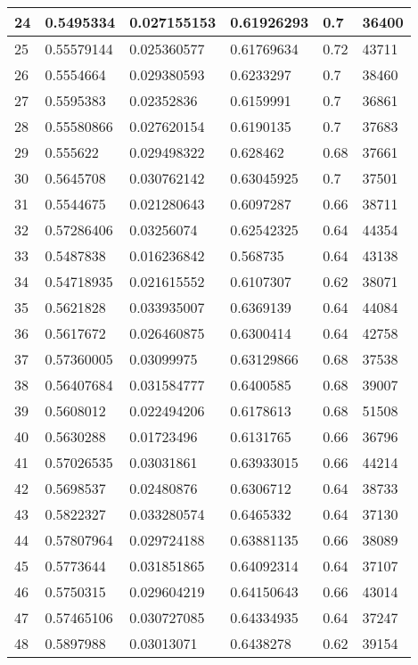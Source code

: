 \begin{longtable}{|l|l|l|l|l|l|}
24 & 0.5495334 & 0.027155153 & 0.61926293 & 0.7 & 36400 \\ \hline 
25 & 0.55579144 & 0.025360577 & 0.61769634 & 0.72 & 43711 \\ \hline 
26 & 0.5554664 & 0.029380593 & 0.6233297 & 0.7 & 38460 \\ \hline 
27 & 0.5595383 & 0.02352836 & 0.6159991 & 0.7 & 36861 \\ \hline 
28 & 0.55580866 & 0.027620154 & 0.6190135 & 0.7 & 37683 \\ \hline 
29 & 0.555622 & 0.029498322 & 0.628462 & 0.68 & 37661 \\ \hline 
30 & 0.5645708 & 0.030762142 & 0.63045925 & 0.7 & 37501 \\ \hline 
31 & 0.5544675 & 0.021280643 & 0.6097287 & 0.66 & 38711 \\ \hline 
32 & 0.57286406 & 0.03256074 & 0.62542325 & 0.64 & 44354 \\ \hline 
33 & 0.5487838 & 0.016236842 & 0.568735 & 0.64 & 43138 \\ \hline 
34 & 0.54718935 & 0.021615552 & 0.6107307 & 0.62 & 38071 \\ \hline 
35 & 0.5621828 & 0.033935007 & 0.6369139 & 0.64 & 44084 \\ \hline 
36 & 0.5617672 & 0.026460875 & 0.6300414 & 0.64 & 42758 \\ \hline 
37 & 0.57360005 & 0.03099975 & 0.63129866 & 0.68 & 37538 \\ \hline 
38 & 0.56407684 & 0.031584777 & 0.6400585 & 0.68 & 39007 \\ \hline 
39 & 0.5608012 & 0.022494206 & 0.6178613 & 0.68 & 51508 \\ \hline 
40 & 0.5630288 & 0.01723496 & 0.6131765 & 0.66 & 36796 \\ \hline 
41 & 0.57026535 & 0.03031861 & 0.63933015 & 0.66 & 44214 \\ \hline 
42 & 0.5698537 & 0.02480876 & 0.6306712 & 0.64 & 38733 \\ \hline 
43 & 0.5822327 & 0.033280574 & 0.6465332 & 0.64 & 37130 \\ \hline 
44 & 0.57807964 & 0.029724188 & 0.63881135 & 0.66 & 38089 \\ \hline 
45 & 0.5773644 & 0.031851865 & 0.64092314 & 0.64 & 37107 \\ \hline 
46 & 0.5750315 & 0.029604219 & 0.64150643 & 0.66 & 43014 \\ \hline 
47 & 0.57465106 & 0.030727085 & 0.64334935 & 0.64 & 37247 \\ \hline 
48 & 0.5897988 & 0.03013071 & 0.6438278 & 0.62 & 39154 \\ \hline 

\end{longtable}
